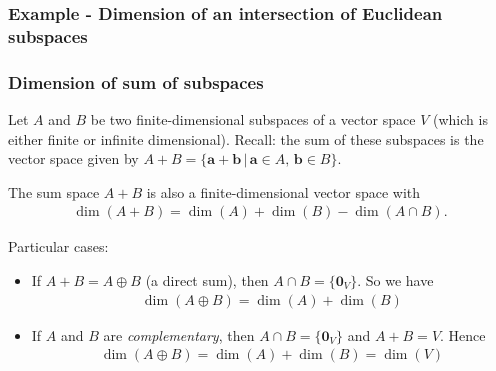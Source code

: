 \documentclass[usenames,dvipsnames,aspectratio=169,10pt]{beamer}
\numberwithin{equation}{section}
\begin{document}
\begin{frame}
\frametitle{Example - Dimension of an intersection of Euclidean subspaces}

\end{frame}
\fi 



\begin{frame}
\frametitle{Dimension of sum of subspaces}

Let $A$ and $B$ be two finite-dimensional subspaces of a vector space $V$ (which is either finite or infinite dimensional). Recall: the sum of these subspaces is the vector space given by $A + B = \{ \mathbf{a} + \mathbf{b} \, | \, \mathbf{a}\in A, \, \mathbf{b}\in B \}$.

The sum space $A+B$ is also a finite-dimensional vector space with
\begin{align*}
\dim(A+B) = \dim(A) + \dim(B) - \dim(A \cap B).
\end{align*}

Particular cases:
\begin{itemize}
\item If $A+B = A \oplus B$ (a direct sum), then $A \cap B = \{\mathbf{0}_V\}$. So we have 
\begin{align*}
\dim(A\oplus B) = \dim(A) + \dim(B)
\end{align*}

\item If $A$ and $B$ are \textit{complementary}, then $A \cap B = \{\mathbf{0}_V\}$ and $A+B = V$. Hence
\begin{align*}
\dim(A\oplus B) = \dim(A) + \dim(B) = \dim(V)
\end{align*}
\end{itemize}

\end{frame}
\end{document}
